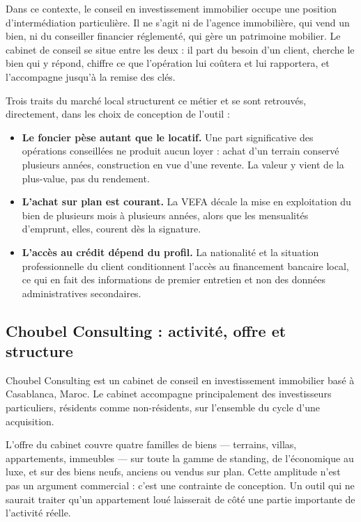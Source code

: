 \documentclass[12pt,a4paper]{article}
\newcommand{\entreprise}{Choubel Consulting}
\newcommand{\villestage}{Casablanca, Maroc}
\begin{document}
Dans ce contexte, le conseil en investissement immobilier occupe une position
d'intermédiation particulière. Il ne s'agit ni de l'agence immobilière, qui vend
un bien, ni du conseiller financier réglementé, qui gère un patrimoine
mobilier. Le cabinet de conseil se situe entre les deux : il part du besoin d'un
client, cherche le bien qui y répond, chiffre ce que l'opération lui coûtera et
lui rapportera, et l'accompagne jusqu'à la remise des clés.

Trois traits du marché local structurent ce métier et se sont retrouvés,
directement, dans les choix de conception de l'outil :

\begin{itemize}
	\item \textbf{Le foncier pèse autant que le locatif.} Une part significative
	des opérations conseillées ne produit aucun loyer : achat d'un terrain
	conservé plusieurs années, construction en vue d'une revente. La valeur y
	vient de la plus-value, pas du rendement.
	\item \textbf{L'achat sur plan est courant.} La VEFA décale la mise en
	exploitation du bien de plusieurs mois à plusieurs années, alors que les
	mensualités d'emprunt, elles, courent dès la signature.
	\item \textbf{L'accès au crédit dépend du profil.} La nationalité et la
	situation professionnelle du client conditionnent l'accès au financement
	bancaire local, ce qui en fait des informations de premier entretien et non
	des données administratives secondaires.
\end{itemize}

\subsection{\entreprise{} : activité, offre et structure}

\entreprise{} est un cabinet de conseil en investissement immobilier basé à
\villestage.  Le cabinet accompagne principalement des investisseurs particuliers,
résidents comme non-résidents, sur l'ensemble du cycle d'une acquisition.

L'offre du cabinet couvre quatre familles de biens --- terrains, villas,
appartements, immeubles --- sur toute la gamme de standing, de l'économique au
luxe, et sur des biens neufs, anciens ou vendus sur plan. Cette amplitude n'est
pas un argument commercial : c'est une contrainte de conception. Un outil qui ne
saurait traiter qu'un appartement loué laisserait de côté une partie importante
de l'activité réelle.
\end{document}
